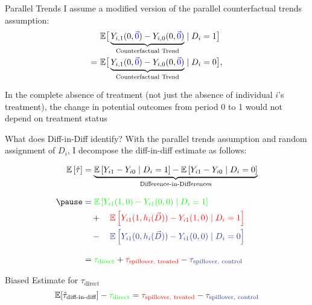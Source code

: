 \documentclass[aspectratio=169]{beamer}
\begin{document}
\begin{frame}{Parallel Trends}
    I assume a modified version of the parallel counterfactual trends assumption: 
    \begin{align*}
        &\mathbb{E}\big[ \underbrace{Y_{i,1}(0, \textcolor{blue}{\vec{0}}) - Y_{i,0}(0, \textcolor{blue}{\vec{0}})}_{\text{Counterfactual Trend}} \mid D_i = 1 \big] \\
        = \ &\mathbb{E}\big[ \underbrace{Y_{i,1}(0, \textcolor{blue}{\vec{0}}) - Y_{i,0}(0, \textcolor{blue}{\vec{0}})}_{\text{Counterfactual Trend}} \mid D_i = 0 \big],
    \end{align*}

    \vspace{5mm}
    In the complete absence of treatment (not just the absence of individual $i$'s treatment), the change in potential outcomes from period 0 to 1 would not depend on treatment status
    
\end{frame}

\begin{frame}{What does Diff-in-Diff identify?}
    With the parallel trends assumption and random assignment of $D_i$, I decompose the diff-in-diff estimate as follows: 
        
    \begin{align*}
        \mathbb{E}\left[\hat{\tau}\right] &= \underbrace{\mathbb{E} \left[ Y_{i1} - Y_{i0} \mid D_i = 1 \right] - \mathbb{E} \left[ Y_{i1} - Y_{i0} \mid D_i = 0 \right]}_{\text{Difference-in-Differences}} \\[3mm]
        \pause&= 
        \textcolor{green}{\mathbb{E} \left[ Y_{i1}(1, 0) - Y_{i1}(0, 0) \mid D_i = 1 \right]} \\
        &\quad + \quad 
        \textcolor{red}{\mathbb{E} \left[ Y_{i1}(1, h_i(\vec{D})) - Y_{i1}(1, 0) \mid D_i = 1 \right]} \\ 
        &\quad - \quad  
        \textcolor{purple}{\mathbb{E} \left[ Y_{i1}(0, h_i(\vec{D})) - Y_{i1}(0, 0) \mid D_i = 0 \right]} \\[3mm]
        &= \textcolor{green}{\tau_{\text{direct}}} + \textcolor{red}{\tau_{\text{spillover, treated}}} - \textcolor{purple}{\tau_{\text{spillover, control}}}
    \end{align*}

\end{frame}

\begin{frame}{Biased Estimate for $\tau_{\text{direct}}$}
    \[ 
        \mathbb{E}[\hat{\tau}_{\text{diff-in-diff}}] - \textcolor{green}{\tau_{\text{direct}}} = \textcolor{red}{\tau_{\text{spillover, treated}}} - \textcolor{purple}{\tau_{\text{spillover, control}}}    
    \]
\end{frame}
\end{document}
